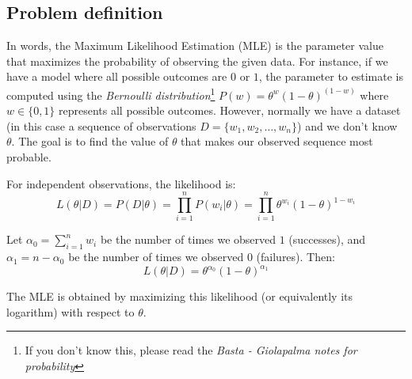 \subsection{Problem definition}
In words, the Maximum Likelihood Estimation (MLE) is the parameter value that maximizes the probability of observing the given data. For instance, if we have a model where all possible outcomes are $0$ or $1$, the parameter to estimate is computed using the \textit{Bernoulli distribution}\footnote{If you don't know this, please read the \textit{Basta - Giolapalma notes for probability}} $P(w) = \theta^w (1-\theta)^{(1-w)}$ where $w\in\{0,1\}$ represents all possible outcomes. However, normally we have a dataset (in this case a sequence of observations $D = \{w_1, w_2, \ldots, w_n\}$) and we don't know $\theta$. The goal is to find the value of $\theta$ that makes our observed sequence most probable.

For independent observations, the likelihood is:
\[
    L(\theta|D) = P(D|\theta) = \prod_{i=1}^n P(w_i|\theta) = \prod_{i=1}^n \theta^{w_i}(1-\theta)^{1-w_i}
\]

Let $\alpha_0 = \sum_{i=1}^n w_i$ be the number of times we observed $1$ (successes), and $\alpha_1 = n - \alpha_0$ be the number of times we observed $0$ (failures). Then:
\[
    L(\theta|D) = \theta^{\alpha_0}(1-\theta)^{\alpha_1}
\]

The MLE is obtained by maximizing this likelihood (or equivalently its logarithm) with respect to $\theta$.


